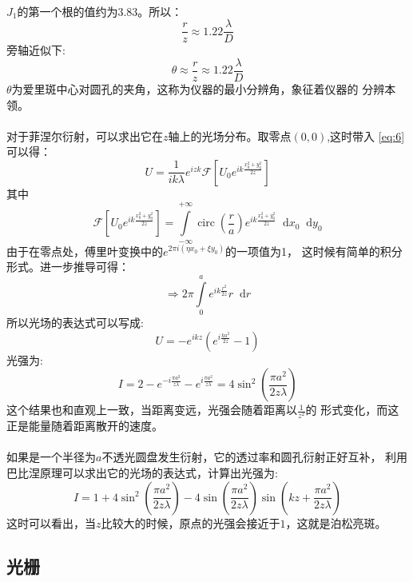 \documentclass{article}
\DeclareMathOperator{\cir}{circ}
\newcommand*{\dif}{\mathop{}\!\mathrm{d}}
\begin{document}
\paragraph{}
$J_1$的第一个根的值约为3.83。所以：
\[\frac{r}{z}\approx 1.22 \frac{\lambda}{D}\]
旁轴近似下:
\[\theta\approx \frac{r}{z}\approx 1.22 \frac{\lambda}{D}\]
$\theta$为爱里斑中心对圆孔的夹角，这称为仪器的最小分辨角，象征着仪器的
分辨本领。
\paragraph{}
对于菲涅尔衍射，可以求出它在$z$轴上的光场分布。取零点$(0,0)$,这时带入
\ref{eq:6}可以得：
\[U=\frac{1}{ik\lambda}e^{izk}\mathscr{F}[U_0e^{ik \frac{x_0^2+y_0^2}{2z}}]\]
其中
\[\mathscr{F}[U_0e^{ik
    \frac{x_0^2+y_0^2}{2z}}]=\int\limits_{-\infty}^{+\infty}\cir(\frac{r}{a})e^{ik
    \frac{x_0^2+y_0^2}{2z}}\dif x_0\dif y_0\]
由于在零点处，傅里叶变换中的$e^{2\pi i(\eta x_0+\xi y_0)}$的一项值为1，
这时候有简单的积分形式。进一步推导可得：
\[\Rightarrow 2\pi\int\limits_0^ae^{ik \frac{r^2}{2z}}r\dif r\]
所以光场的表达式可以写成:
\[U=-e^{ikz}(e^{i \frac{k a^2}{2z}}-1)\]
光强为:
\[I=2-e^{-i \frac{\pi a^2}{z\lambda}}-e^{i
    \frac{\pi a^2}{z\lambda}}=4\sin^2(\frac{\pi a^2}{2z\lambda})\]
这个结果也和直观上一致，当距离变远，光强会随着距离以$\frac{1}{z^2}$的
形式变化，而这正是能量随着距离散开的速度。
\paragraph{}
如果是一个半径为$a$不透光圆盘发生衍射，它的透过率和圆孔衍射正好互补，
利用巴比涅原理可以求出它的光场的表达式，计算出光强为:
\[I=1+4\sin^2(\frac{\pi a^2}{2z\lambda})-4\sin(\frac{\pi
    a^2}{2z\lambda})\sin(kz+\frac{\pi a^2}{2z\lambda})\]
这时可以看出，当$z$比较大的时候，原点的光强会接近于$1$，这就是泊松亮斑。
\subsection{光栅}
\end{document}

